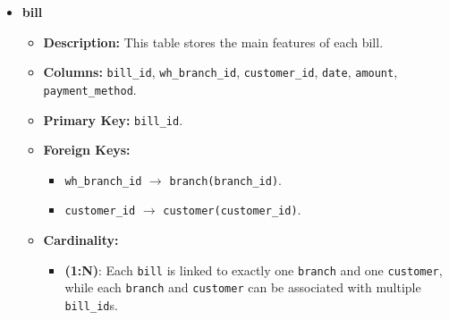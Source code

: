 \documentclass[12pt,a4paper]{article}
\begin{document}
\begin{itemize}
    \item \textbf{bill}
    \begin{itemize}
        \item \textbf{Description:} This table stores the main features of each bill.
        \item \textbf{Columns:} \texttt{bill\_id}, \texttt{wh\_branch\_id}, \texttt{customer\_id}, \texttt{date}, \texttt{amount}, \texttt{payment\_method}.
        \item \textbf{Primary Key:} \texttt{bill\_id}.
        \item \textbf{Foreign Keys:} 
        \begin{itemize}
            \item \texttt{wh\_branch\_id} $\to$ \texttt{branch(branch\_id)}.
            \item \texttt{customer\_id} $\to$ \texttt{customer(customer\_id)}.
        \end{itemize}
        \item \textbf{Cardinality:}
        \begin{itemize}
             \item \textbf{(1:N)}: Each \texttt{bill} is linked to exactly one \texttt{branch} and one \texttt{customer}, while each \texttt{branch} and \texttt{customer} can be associated with multiple \texttt{bill\_id}s.
        \end{itemize}
    \end{itemize}


\end{itemize}
\end{document}
